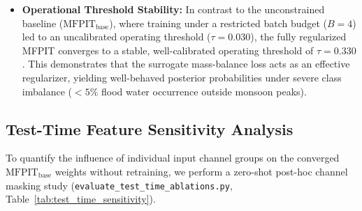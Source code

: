 \documentclass[journal]{IEEEtran}
\begin{document}
\begin{itemize}
    \item \textbf{Operational Threshold Stability:} In contrast to the unconstrained baseline ($\text{MFPIT}_{\text{base}}$), where training under a restricted batch budget ($B=4$) led to an uncalibrated operating threshold ($\tau = 0.030$), the fully regularized MFPIT converges to a stable, well-calibrated operating threshold of $\tau = 0.330$. This demonstrates that the surrogate mass-balance loss acts as an effective regularizer, yielding well-behaved posterior probabilities under severe class imbalance ($<5\%$ flood water occurrence outside monsoon peaks).
\end{itemize}

\subsection{Test-Time Feature Sensitivity Analysis}
To quantify the influence of individual input channel groups on the converged $\text{MFPIT}_{\text{base}}$ weights without retraining, we perform a zero-shot post-hoc channel masking study (\texttt{evaluate\_test\_time\_ablations.py}, Table~\ref{tab:test_time_sensitivity}).

\begin{table}[!t]
\caption{Zero-Shot Test-Time Channel Masking Results on $\text{MFPIT}_{\text{base}}$ (\texttt{test\_time\_ablation\_metrics.json})}
\label{tab:test_time_sensitivity}
\centering
{}
\end{table}
\end{document}
